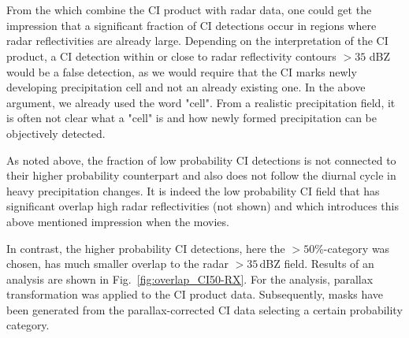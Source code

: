 \section{}

From the    which combine the CI product with radar data, one could get the impression that a significant fraction of CI detections occur in regions where radar reflectivities are already large. Depending on the interpretation of the CI product, a CI detection within or close to radar reflectivity contours $>35$ dBZ would be a false detection, as we would require that the CI  marks  newly  developing precipitation cell and not an already existing one. In the above argument, we already used the word "cell". From a realistic precipitation field, it is often not clear what a "cell" is and how newly formed precipitation can be objectively detected. 

As noted above, the fraction of low probability CI detections is not connected to their higher probability counterpart and also does not follow the diurnal cycle in heavy precipitation changes. It is indeed the low probability CI field that has significant overlap  high radar reflectivities (not shown) and which introduces this above mentioned impression when  the movies. 

In contrast, the higher probability CI detections, here the $>50\%$-category was chosen, has much smaller overlap to the radar $>35$\,dBZ field. Results of an analysis are shown in Fig.~\ref{fig:overlap_CI50-RX}. For the analysis,  parallax transformation was applied  to the CI product data. Subsequently, masks have been generated from the parallax-corrected CI data selecting a certain probability category. 

 

